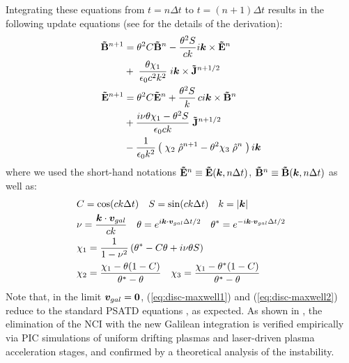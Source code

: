 \documentclass[]{report}
\begin{document}
Integrating these equations from $t=n\Delta
t$ to $t=(n+1)\Delta t$ results in the following update equations (see
\cite{LeheARXIV2016} for the details of the derivation):
%
\begin{subequations}
\begin{align}
%
\fb^{n+1} &= \theta^2 C \fb^n
 -\frac{\theta^2 S}{ck}i\vec{k}\times \fe^n \nonumber \\
& + \;\frac{\theta \chi_1}{\epsilon_0c^2k^2}\;i\vec{k} \times
                     \fj^{n+1/2} \label{eq:disc-maxwell1}\\
%
\fe^{n+1} &=  \theta^2 C  \fe^n
 +\frac{\theta^2 S}{k} \,c i\vec{k}\times \fb^n \nonumber \\
& +\frac{i\nu \theta \chi_1 - \theta^2S}{\epsilon_0 ck} \; \fj^{n+1/2}\nonumber \\
& - \frac{1}{\epsilon_0k^2}\left(\; \chi_2\;\mc{\rho}^{n+1} -
  \theta^2\chi_3\;\mc{\rho}^{n} \;\right) i\vec{k} \label{eq:disc-maxwell2}
%
\end{align}
\end{subequations}
%
where we used the short-hand notations $\fe^n \equiv
%
\fe(\vec{k}, n\Delta t)$, $\mathbf{\tilde{B}}^n \equiv
\mathbf{\tilde{B}}(\boldsymbol{k}, n\Delta t)$ as well as:
\begin{subequations}
\begin{align}
&C = \cos(ck\Delta t) \quad S = \sin(ck\Delta t) \quad k
= |\boldsymbol{k}| \label{eq:def-C-S}\\&
\nu = \frac{\boldsymbol{k}\cdot\boldsymbol{v}_{gal}}{ck} \quad \theta =
  e^{i\boldsymbol{k}\cdot\boldsymbol{v}_{gal}\Delta t/2} \quad \theta^* =
  e^{-i\boldsymbol{k}\cdot\boldsymbol{v}_{gal}\Delta t/2} \label{eq:def-nu-theta}\\&
\chi_1 =  \frac{1}{1 -\nu^2} \left( \theta^* -  C \theta + i
  \nu \theta S \right) \label{eq:def-chi1}\\&
\chi_2 = \frac{\chi_1 - \theta(1-C)}{\theta^*-\theta} \quad
\chi_3 = \frac{\chi_1-\theta^*(1-C)}{\theta^*-\theta} \label{eq:def-chi23}
\end{align}
\end{subequations}
Note that, in the limit $\boldsymbol{v}_{gal}=\boldsymbol{0}$,
(\ref{eq:disc-maxwell1}) and (\ref{eq:disc-maxwell2}) reduce to the standard PSATD
equations \cite{Habericnsp73}, as expected. 
As shown in \cite{KirchenARXIV2016,LeheARXIV2016}, 
the elimination of the NCI with the new Galilean integration is verified empirically via PIC simulations of uniform drifting plasmas and laser-driven plasma acceleration stages, and confirmed by a theoretical analysis of the instability.

\end{document}
